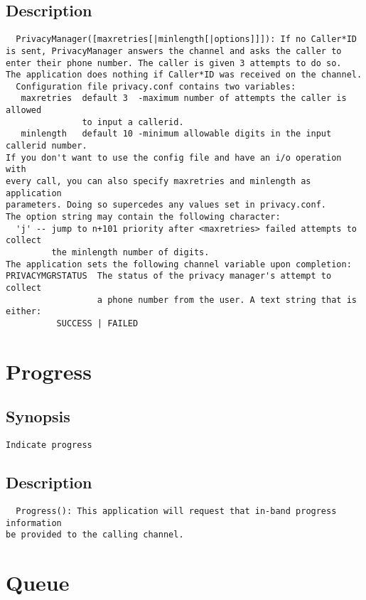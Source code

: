 \subsection{Description}
\begin{verbatim}
  PrivacyManager([maxretries[|minlength[|options]]]): If no Caller*ID 
is sent, PrivacyManager answers the channel and asks the caller to
enter their phone number. The caller is given 3 attempts to do so.
The application does nothing if Caller*ID was received on the channel.
  Configuration file privacy.conf contains two variables:
   maxretries  default 3  -maximum number of attempts the caller is allowed 
               to input a callerid.
   minlength   default 10 -minimum allowable digits in the input callerid number.
If you don't want to use the config file and have an i/o operation with
every call, you can also specify maxretries and minlength as application
parameters. Doing so supercedes any values set in privacy.conf.
The option string may contain the following character: 
  'j' -- jump to n+101 priority after <maxretries> failed attempts to collect
         the minlength number of digits.
The application sets the following channel variable upon completion: 
PRIVACYMGRSTATUS  The status of the privacy manager's attempt to collect 
                  a phone number from the user. A text string that is either:
          SUCCESS | FAILED 

\end{verbatim}


\section{Progress}
\subsection{Synopsis}
\begin{verbatim}
Indicate progress
\end{verbatim}
\subsection{Description}
\begin{verbatim}
  Progress(): This application will request that in-band progress information
be provided to the calling channel.

\end{verbatim}


\section{Queue}

